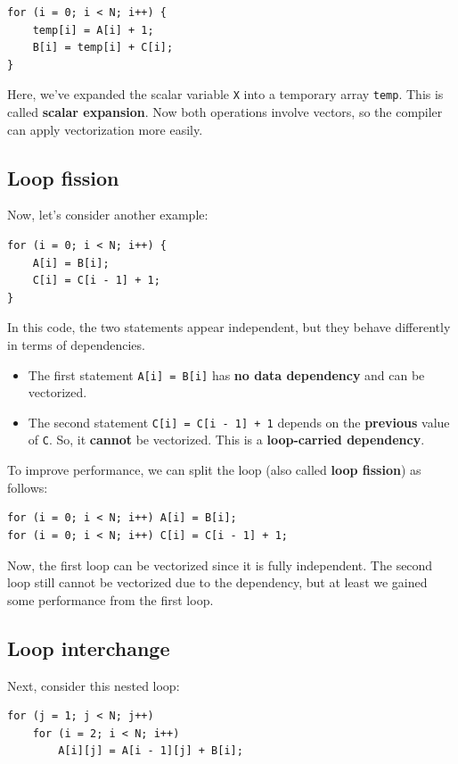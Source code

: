 \documentclass[12pt]{book}
\begin{document}
\begin{lstlisting}[style=cppstyle]
for (i = 0; i < N; i++) {
    temp[i] = A[i] + 1;
    B[i] = temp[i] + C[i];
}
\end{lstlisting}

Here, we’ve expanded the scalar variable \texttt{X} into a temporary array \texttt{temp}. This is called \textbf{scalar expansion}. Now both operations involve vectors, so the compiler can apply vectorization more easily.

\subsection{Loop fission}
Now, let’s consider another example:
\begin{lstlisting}[style=cppstyle]
for (i = 0; i < N; i++) {
    A[i] = B[i];
    C[i] = C[i - 1] + 1;
}
\end{lstlisting}

In this code, the two statements appear independent, but they behave differently in terms of dependencies.

\begin{itemize}
    \item The first statement \texttt{A[i] = B[i]} has \textbf{no data dependency} and can be vectorized.
    \item The second statement \texttt{C[i] = C[i - 1] + 1} depends on the \textbf{previous} value of \texttt{C}. So, it \textbf{cannot} be vectorized. This is a \textbf{loop-carried dependency}.
\end{itemize}

To improve performance, we can split the loop (also called \textbf{loop fission}) as follows:

\begin{lstlisting}[style=cppstyle]
for (i = 0; i < N; i++) A[i] = B[i];
for (i = 0; i < N; i++) C[i] = C[i - 1] + 1;
\end{lstlisting}

Now, the first loop can be vectorized since it is fully independent. The second loop still cannot be vectorized due to the dependency, but at least we gained some performance from the first loop.

\subsection{Loop interchange}
Next, consider this nested loop:
\begin{lstlisting}[style=cppstyle]
for (j = 1; j < N; j++)
    for (i = 2; i < N; i++)
        A[i][j] = A[i - 1][j] + B[i];
\end{lstlisting}
\end{document}
